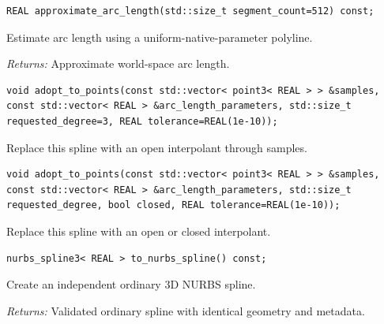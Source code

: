 \par\noindent\begin{minipage}{\linewidth}
\begin{lstlisting}[style=apireference]
REAL approximate_arc_length(std::size_t segment_count=512) const;
\end{lstlisting}
{\footnotesize Estimate arc length using a uniform-native-parameter polyline.\par}
{\footnotesize\textit{Returns:} Approximate world-space arc length.\par}
\end{minipage}\par\vspace{1pt}
\par\noindent\begin{minipage}{\linewidth}
\begin{lstlisting}[style=apireference]
void adopt_to_points(const std::vector< point3< REAL > > &samples, const std::vector< REAL > &arc_length_parameters, std::size_t requested_degree=3, REAL tolerance=REAL(1e-10));
\end{lstlisting}
{\footnotesize Replace this spline with an open interpolant through samples.\par}
\end{minipage}\par\vspace{1pt}
\par\noindent\begin{minipage}{\linewidth}
\begin{lstlisting}[style=apireference]
void adopt_to_points(const std::vector< point3< REAL > > &samples, const std::vector< REAL > &arc_length_parameters, std::size_t requested_degree, bool closed, REAL tolerance=REAL(1e-10));
\end{lstlisting}
{\footnotesize Replace this spline with an open or closed interpolant.\par}
\end{minipage}\par\vspace{1pt}
\par\noindent\begin{minipage}{\linewidth}
\begin{lstlisting}[style=apireference]
nurbs_spline3< REAL > to_nurbs_spline() const;
\end{lstlisting}
{\footnotesize Create an independent ordinary 3D NURBS spline.\par}
{\footnotesize\textit{Returns:} Validated ordinary spline with identical geometry and metadata.\par}
\end{minipage}\par\vspace{1pt}

